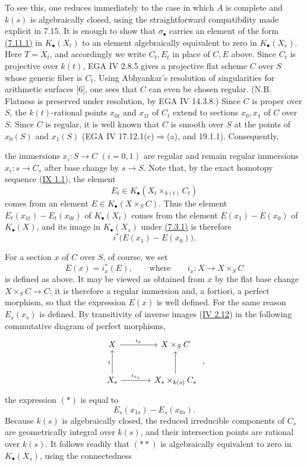 To see this, one reduces immediately to the case in which $A$ is complete
and $k(s)$ is algebraically closed, using the straightforward compatibility
made explicit in 7.15. It is enough to show that $\sigma_\bullet$ carries an
element of the form \hyperlink{sga6.e10.eq.7-11-1}{(7.11.1)} in $K_\bullet(X_t)$ to an element algebraically
equivalent to zero in $K_\bullet(X_s)$. Here $T=X_t$, and accordingly we
write $C_t,E_t$ in place of $C,E$ above. Since $C_t$ is projective over
$k(t)$, EGA IV 2.8.5 gives a projective flat scheme $C$ over $S$ whose
generic fiber is $C_t$. Using Abhyankar's resolution of singularities for
arithmetic surfaces [6], one sees that $C$ can even be chosen regular.
(N.B. Flatness is preserved under resolution, by EGA IV 14.3.8.) Since $C$ is
proper over $S$, the $k(t)$-rational points $x_{0t}$ and $x_{1t}$ of $C_t$
extend to sections $x_0,x_1$ of $C$ over $S$. Since $C$ is regular, it is
well known that $C$ is smooth over $S$ at the points of $x_0(S)$ and
$x_1(S)$ (EGA IV 17.12.1(c)$\Rightarrow$(a), and 19.1.1). Consequently,

the immersions $x_i:S\to C$ $(i=0,1)$ are regular and remain regular
immersions $x_i:s\to C_s$ after base change by $s\to S$. Note that, by the
exact homotopy sequence (\hyperlink{sga6.e09.prop.1-1}{IX 1.1}), the element
\[
E_t\in K_\bullet(X_t\times_{k(t)}C_t)
\]
comes from an element $E\in K_\bullet(X\times_SC)$. Thus the element
$E_t(x_{1t})-E_t(x_{0t})$ of $K_\bullet(X_t)$ comes from the element
$E(x_1)-E(x_0)$ of $K_\bullet(X)$, and its image in $K_\bullet(X_s)$ under
\hyperlink{sga6.e10.eq.7-3-1}{(7.3.1)} is therefore
\[
i^*\bigl(E(x_1)-E(x_0)\bigr).
\tag{*}
\]

For a section $x$ of $C$ over $S$, of course, we set
\[
E(x)=i_x^*(E),
\qquad\text{where}\qquad
i_x:X\longrightarrow X\times_SC
\]
is defined as above. It may be viewed as obtained from $x$ by the flat base
change $X\times_SC\to C$; it is therefore a regular immersion and, a
fortiori, a perfect morphism, so that the expression $E(x)$ is well defined.
For the same reason $E_s(x_s)$ is defined. By transitivity of inverse images
(\hyperlink{sga6.e04.para.2-12}{IV 2.12}) in the following commutative diagram of perfect morphisms,
\[
\begin{tikzcd}[column sep=large,row sep=large]
X \arrow[r,"i_x"] & X\times_SC\\
X_s \arrow[u,"i"] \arrow[r,"i_{x_s}"] &
X_s\times_{k(s)}C_s \arrow[u]
\end{tikzcd}
\;,
\]
the expression $(*)$ is equal to
\[
E_s(x_{1s})-E_s(x_{0s}).
\tag{**}
\]
Because $k(s)$ is algebraically closed, the reduced irreducible components
of $C_s$ are geometrically integral over $k(s)$, and their intersection
points are rational over $k(s)$. It follows readily that $(**)$ is
algebraically equivalent to zero in $K_\bullet(X_s)$, using the connectedness

